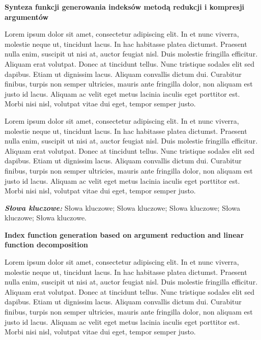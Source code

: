 \newpage
\vspace{10cm}

\newpage
\begin{center}
	\textbf{Synteza funkcji generowania indeksów metodą redukcji i kompresji argumentów}
\end{center}

Lorem ipsum dolor sit amet, consectetur adipiscing elit. In et nunc viverra, molestie neque ut, tincidunt lacus. In hac habitasse platea dictumst. Praesent nulla enim, suscipit ut nisi at, auctor feugiat nisl. Duis molestie fringilla efficitur. Aliquam erat volutpat. Donec at tincidunt tellus. Nunc tristique sodales elit sed dapibus. Etiam ut dignissim lacus. Aliquam convallis dictum dui. Curabitur finibus, turpis non semper ultricies, mauris ante fringilla dolor, non aliquam est justo id lacus. Aliquam ac velit eget metus lacinia iaculis eget porttitor est. Morbi nisi nisl, volutpat vitae dui eget, tempor semper justo.

Lorem ipsum dolor sit amet, consectetur adipiscing elit. In et nunc viverra, molestie neque ut, tincidunt lacus. In hac habitasse platea dictumst. Praesent nulla enim, suscipit ut nisi at, auctor feugiat nisl. Duis molestie fringilla efficitur. Aliquam erat volutpat. Donec at tincidunt tellus. Nunc tristique sodales elit sed dapibus. Etiam ut dignissim lacus. Aliquam convallis dictum dui. Curabitur finibus, turpis non semper ultricies, mauris ante fringilla dolor, non aliquam est justo id lacus. Aliquam ac velit eget metus lacinia iaculis eget porttitor est. Morbi nisi nisl, volutpat vitae dui eget, tempor semper justo.

\textit{\textbf{Słowa kluczowe:}} Słowa kluczowe; Słowa kluczowe; Słowa kluczowe; Słowa kluczowe; Słowa kluczowe.

	\vspace{1cm}
\newpage %

\begin{center}
    \textbf{Index function generation based on argument reduction and linear function decomposition}
\end{center}

Lorem ipsum dolor sit amet, consectetur adipiscing elit. In et nunc viverra, molestie neque ut, tincidunt lacus. In hac habitasse platea dictumst. Praesent nulla enim, suscipit ut nisi at, auctor feugiat nisl. Duis molestie fringilla efficitur. Aliquam erat volutpat. Donec at tincidunt tellus. Nunc tristique sodales elit sed dapibus. Etiam ut dignissim lacus. Aliquam convallis dictum dui. Curabitur finibus, turpis non semper ultricies, mauris ante fringilla dolor, non aliquam est justo id lacus. Aliquam ac velit eget metus lacinia iaculis eget porttitor est. Morbi nisi nisl, volutpat vitae dui eget, tempor semper justo.

